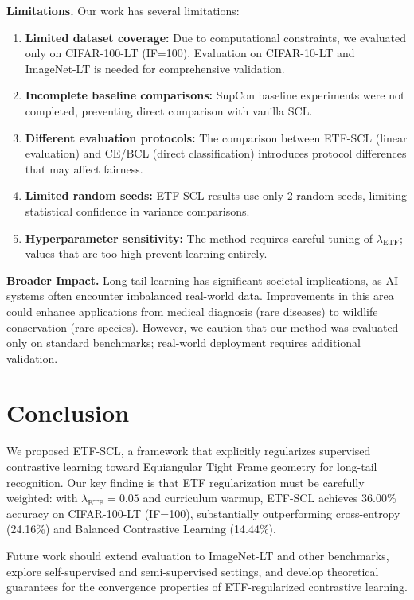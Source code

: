 \documentclass{article}
\begin{document}
\textbf{Limitations.} Our work has several limitations:
\begin{enumerate}
    \item \textbf{Limited dataset coverage:} Due to computational constraints, we evaluated only on CIFAR-100-LT (IF=100). Evaluation on CIFAR-10-LT and ImageNet-LT is needed for comprehensive validation.
    \item \textbf{Incomplete baseline comparisons:} SupCon baseline experiments were not completed, preventing direct comparison with vanilla SCL.
    \item \textbf{Different evaluation protocols:} The comparison between ETF-SCL (linear evaluation) and CE/BCL (direct classification) introduces protocol differences that may affect fairness.
    \item \textbf{Limited random seeds:} ETF-SCL results use only 2 random seeds, limiting statistical confidence in variance comparisons.
    \item \textbf{Hyperparameter sensitivity:} The method requires careful tuning of $\lambda_{\text{ETF}}$; values that are too high prevent learning entirely.
\end{enumerate}

\textbf{Broader Impact.} Long-tail learning has significant societal implications, as AI systems often encounter imbalanced real-world data. Improvements in this area could enhance applications from medical diagnosis (rare diseases) to wildlife conservation (rare species). However, we caution that our method was evaluated only on standard benchmarks; real-world deployment requires additional validation.

\section{Conclusion}

We proposed ETF-SCL, a framework that explicitly regularizes supervised contrastive learning toward Equiangular Tight Frame geometry for long-tail recognition. Our key finding is that ETF regularization must be carefully weighted: with $\lambda_{\text{ETF}} = 0.05$ and curriculum warmup, ETF-SCL achieves 36.00\% accuracy on CIFAR-100-LT (IF=100), substantially outperforming cross-entropy (24.16\%) and Balanced Contrastive Learning (14.44\%).

Future work should extend evaluation to ImageNet-LT and other benchmarks, explore self-supervised and semi-supervised settings, and develop theoretical guarantees for the convergence properties of ETF-regularized contrastive learning.
\end{document}
